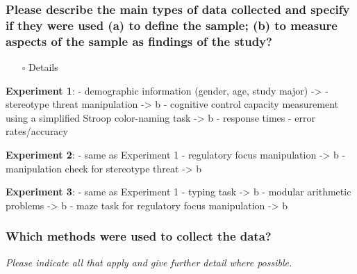 \documentclass[
  doc, a4paper]{apa7}
\providecommand{\tightlist}{%
  \setlength{\itemsep}{0pt}\setlength{\parskip}{0pt}}
\begin{document}
\subsubsection{Please describe the main types of data collected and specify if they were used (a) to define the sample; (b) to measure aspects of the sample as findings of the study?}\label{please-describe-the-main-types-of-data-collected-and-specify-if-they-were-used-a-to-define-the-sample-b-to-measure-aspects-of-the-sample-as-findings-of-the-study}

\begin{itemize}
\tightlist
\item[$\square$]
  Details
\end{itemize}

\textbf{Experiment 1}:
- demographic information (gender, age, study major) -\textgreater{}
- stereotype threat manipulation -\textgreater{} b
- cognitive control capacity measurement using a simplified Stroop color-naming task -\textgreater{} b
- response times
- error rates/accuracy

\textbf{Experiment 2}:
- same as Experiment 1
- regulatory focus manipulation -\textgreater{} b
- manipulation check for stereotype threat -\textgreater{} b

\textbf{Experiment 3}:
- same as Experiment 1
- typing task -\textgreater{} b
- modular arithmetic problems -\textgreater{} b
- maze task for regulatory focus manipulation -\textgreater{} b

\subsubsection{Which methods were used to collect the data?}\label{which-methods-were-used-to-collect-the-data}

\emph{Please indicate all that apply and give further detail where possible.}
\end{document}
